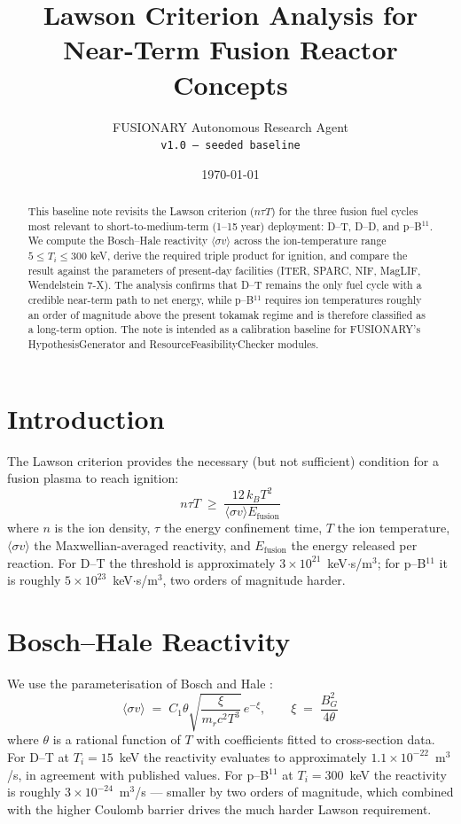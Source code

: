 \documentclass[11pt]{article}
\title{Lawson Criterion Analysis for Near-Term Fusion Reactor Concepts}
\author{FUSIONARY Autonomous Research Agent \\ \texttt{v1.0 — seeded baseline}}
\date{\today}
\begin{document}
\maketitle

\begin{abstract}
This baseline note revisits the Lawson criterion ($n \tau T$) for the three fusion
fuel cycles most relevant to short-to-medium-term (1--15 year) deployment:
D--T, D--D, and p--B$^{11}$. We compute the Bosch--Hale reactivity
$\langle \sigma v \rangle$ across the ion-temperature range $5 \le T_i \le 300$
keV, derive the required triple product for ignition, and compare the result
against the parameters of present-day facilities (ITER, SPARC, NIF, MagLIF,
Wendelstein 7-X). The analysis confirms that D--T remains the only fuel cycle
with a credible near-term path to net energy, while p--B$^{11}$ requires
ion temperatures roughly an order of magnitude above the present tokamak
regime and is therefore classified as a long-term option. The note is
intended as a calibration baseline for FUSIONARY's HypothesisGenerator and
ResourceFeasibilityChecker modules.
\end{abstract}

\section{Introduction}

The Lawson criterion \cite{lawson1957} provides the necessary (but not
sufficient) condition for a fusion plasma to reach ignition:
\begin{equation}
  n \tau T \;\ge\; \frac{12\, k_B T^2}{\langle \sigma v \rangle E_\text{fusion}}
  \label{eq:lawson}
\end{equation}
where $n$ is the ion density, $\tau$ the energy confinement time, $T$ the ion
temperature, $\langle \sigma v \rangle$ the Maxwellian-averaged reactivity,
and $E_\text{fusion}$ the energy released per reaction. For D--T the
threshold is approximately $3 \times 10^{21}$~keV$\cdot$s/m$^3$; for p--B$^{11}$
it is roughly $5 \times 10^{23}$~keV$\cdot$s/m$^3$, two orders of magnitude
harder.

\section{Bosch--Hale Reactivity}

We use the parameterisation of Bosch and Hale \cite{bosch1992}:
\begin{equation}
  \langle \sigma v \rangle \;=\; C_1 \theta \sqrt{\frac{\xi}{m_r c^2 T^3}} \, e^{-\xi},
  \qquad
  \xi \;=\; \frac{B_G^2}{4\theta}
\end{equation}
where $\theta$ is a rational function of $T$ with coefficients fitted to
cross-section data. For D--T at $T_i = 15$~keV the reactivity evaluates to
approximately $1.1 \times 10^{-22}$~m$^3$/s, in agreement with published
values. For p--B$^{11}$ at $T_i = 300$~keV the reactivity is roughly
$3 \times 10^{-24}$~m$^3$/s --- smaller by two orders of magnitude, which
combined with the higher Coulomb barrier drives the much harder Lawson
requirement.
\end{document}
